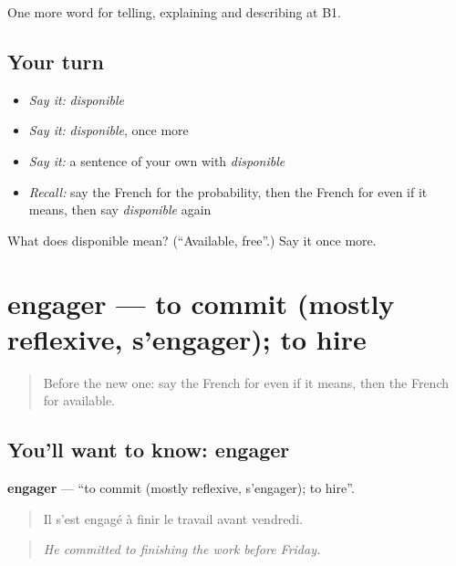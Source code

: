 \begin{grammarlens}[title={What you've built}]
One more word for telling, explaining and describing at B1.
\end{grammarlens}

\subsection*{Your turn}
\begin{itemize}
\raggedright
  \item \emph{Say it:} \emph{disponible}
  \item \emph{Say it:} \emph{disponible}, once more
  \item \emph{Say it:} a sentence of your own with \emph{disponible}
  \item \emph{Recall:} say the French for the probability, then the French for even if it means, then say \emph{disponible} again
\end{itemize}

\begin{tcolorbox}[breakable,colback=teal!4,colframe=teal!35!black,title={Before you move on}]
What does disponible mean? (\textquotedblleft{}Available, free\textquotedblright{}.) Say it once more.
\end{tcolorbox}
\section[engager]{engager — to commit (mostly reflexive, s'engager); to hire}

\label{lesson:FR-C373-engager}



\begin{quote}
Before the new one: say the French for even if it means, then the French for available.
\end{quote}

\subsection*{You'll want to know: engager}
\textbf{engager} — \textquotedblleft{}to commit (mostly reflexive, s'engager); to hire\textquotedblright{}.

\begin{quote}
Il s'est engagé à finir le travail avant vendredi.
\end{quote}

\begin{quote}
\emph{He committed to finishing the work before Friday.}
\end{quote}

